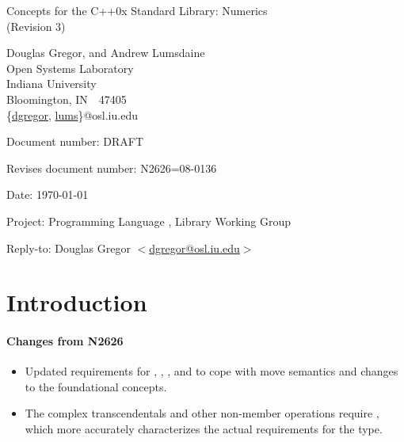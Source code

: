 \documentclass[american,twoside]{book}
\begin{document}
\raggedbottom

\begin{titlepage}
\begin{center}
\huge
Concepts for the C++0x Standard Library: Numerics\\
(Revision 3)

\vspace{0.5in}

\normalsize
Douglas Gregor, and Andrew Lumsdaine \\
Open Systems Laboratory \\
Indiana University \\
Bloomington, IN\ \  47405 \\
\{\href{mailto:dgregor@osl.iu.edu}{dgregor}, \href{mailto:lums@osl.iu.edu}{lums}\}@osl.iu.edu

\end{center}

\vspace{1in}
\par\noindent Document number: DRAFT\vspace{-6pt}
\par\noindent Revises document number: N2626=08-0136\vspace{-6pt}
\par\noindent Date: \today\vspace{-6pt}
\par\noindent Project: Programming Language \Cpp{}, Library Working Group\vspace{-6pt}
\par\noindent Reply-to: Douglas Gregor $<$\href{mailto:dgregor@osl.iu.edu}{dgregor@osl.iu.edu}$>$\vspace{-6pt}

\section*{Introduction}

\paragraph*{Changes from N2626}
\begin{itemize}
\item Updated requirements for ,
  , , and
   to cope with move semantics and changes
  to the foundational concepts.
\item The complex transcendentals and other non-member operations
  require , which more accurately
  characterizes the actual requirements for the  type.
\end{itemize}


\end{titlepage}
\end{document}
